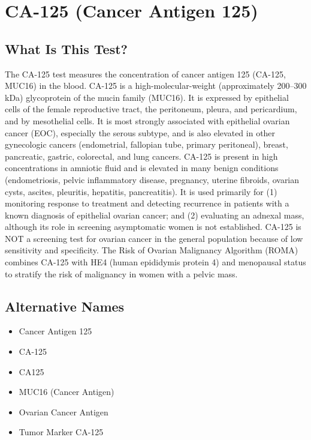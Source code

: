\chapter{CA-125 (Cancer Antigen 125)}

\section*{What Is This Test?}
The CA-125 test measures the concentration of cancer antigen 125 (CA-125, MUC16) in the blood. CA-125 is a high-molecular-weight (approximately 200--300 kDa) glycoprotein of the mucin family (MUC16). It is expressed by epithelial cells of the female reproductive tract, the peritoneum, pleura, and pericardium, and by mesothelial cells. It is most strongly associated with epithelial ovarian cancer (EOC), especially the serous subtype, and is also elevated in other gynecologic cancers (endometrial, fallopian tube, primary peritoneal), breast, pancreatic, gastric, colorectal, and lung cancers. CA-125 is present in high concentrations in amniotic fluid and is elevated in many benign conditions (endometriosis, pelvic inflammatory disease, pregnancy, uterine fibroids, ovarian cysts, ascites, pleuritis, hepatitis, pancreatitis). It is used primarily for (1) monitoring response to treatment and detecting recurrence in patients with a known diagnosis of epithelial ovarian cancer; and (2) evaluating an adnexal mass, although its role in screening asymptomatic women is not established. CA-125 is NOT a screening test for ovarian cancer in the general population because of low sensitivity and specificity. The Risk of Ovarian Malignancy Algorithm (ROMA) combines CA-125 with HE4 (human epididymis protein 4) and menopausal status to stratify the risk of malignancy in women with a pelvic mass.

\section*{Alternative Names}
\begin{itemize}
  \item Cancer Antigen 125
  \item CA-125
  \item CA125
  \item MUC16 (Cancer Antigen)
  \item Ovarian Cancer Antigen
  \item Tumor Marker CA-125
\end{itemize}
